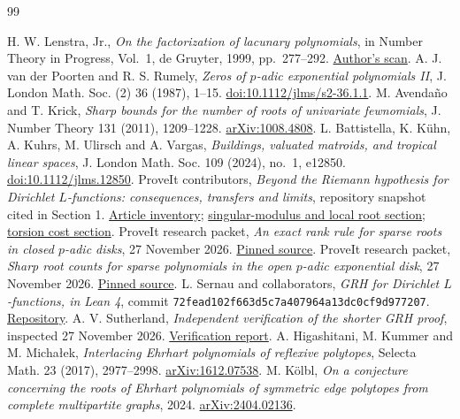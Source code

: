 \documentclass[11pt,letterpaper]{article}
\theoremstyle{definition}\newtheorem{definition}[theorem]{Definition}
\theoremstyle{remark}\newtheorem{remark}[theorem]{Remark}
\newcommand{\repo}{https://github.com/VladimirReshetnikov/ProveIt/blob/b82291c1f75389938c7464ef161907d7d5e75b2a/Analysis/GeneralizedRiemannHypothesis}
\begin{document}
\begin{thebibliography}{99}\raggedright
{} H. W. Lenstra, Jr., \emph{On the factorization of
lacunary polynomials}, in Number Theory in Progress, Vol.~1,
de Gruyter, 1999, pp.~277--292.
\href{https://pub.math.leidenuniv.nl/~lenstrahw/PUBLICATIONS/1999b/art.pdf}{Author's scan}.
 A. J. van der Poorten and R. S. Rumely,
\emph{Zeros of $p$-adic exponential polynomials II}, J. London Math.
Soc. (2) 36 (1987), 1--15.
\href{https://doi.org/10.1112/jlms/s2-36.1.1}{doi:10.1112/jlms/s2-36.1.1}.
 M. Avenda\~no and T. Krick,
\emph{Sharp bounds for the number of roots of univariate fewnomials},
J. Number Theory 131 (2011), 1209--1228.
\href{https://arxiv.org/abs/1008.4808}{arXiv:1008.4808}.
 L. Battistella, K. K\"uhn, A. Kuhrs, M. Ulirsch
and A. Vargas, \emph{Buildings, valuated matroids, and tropical linear
spaces}, J. London Math. Soc. 109 (2024), no.~1, e12850.
\href{https://doi.org/10.1112/jlms.12850}{doi:10.1112/jlms.12850}.
 ProveIt contributors, \emph{Beyond the Riemann
hypothesis for Dirichlet $L$-functions: consequences, transfers and
limits}, repository snapshot cited in Section 1.
\href{\repo/Article/README.md}{Article inventory};
\href{\repo/Article/sections/smd.tex}{singular-modulus and local root section};
\href{\repo/Article/sections/cost.tex}{torsion cost section}.
 ProveIt research packet, \emph{An exact rank rule
for sparse roots in closed $p$-adic disks}, 27 November 2026.
\href{\repo/Research/padic-support-rank/report.tex}{Pinned source}.
 ProveIt research packet, \emph{Sharp root counts
for sparse polynomials in the open $p$-adic exponential disk},
27 November 2026.
\href{\repo/Research/sparse-padic-roots-and-graph-towers/fewnomial/paper.tex}{Pinned source}.
 L. Sernau and collaborators, \emph{GRH for Dirichlet
$L$-functions, in Lean 4}, commit
\texttt{72fead102f663d5c7a407964a13dc0cf9d977207}.
\href{https://github.com/lsernau/grh-lean}{Repository}.
 A. V. Sutherland, \emph{Independent verification
of the shorter GRH proof}, inspected 27 November 2026.
\href{https://math.mit.edu/~drew/shortgrh/}{Verification report}.
 A. Higashitani, M. Kummer and M. Micha\l ek,
\emph{Interlacing Ehrhart polynomials of reflexive polytopes},
Selecta Math. 23 (2017), 2977--2998.
\href{https://arxiv.org/abs/1612.07538}{arXiv:1612.07538}.
 M. K\"olbl, \emph{On a conjecture concerning the roots
of Ehrhart polynomials of symmetric edge polytopes from complete
multipartite graphs}, 2024.
\href{https://arxiv.org/abs/2404.02136}{arXiv:2404.02136}.
\end{thebibliography}
\end{document}
